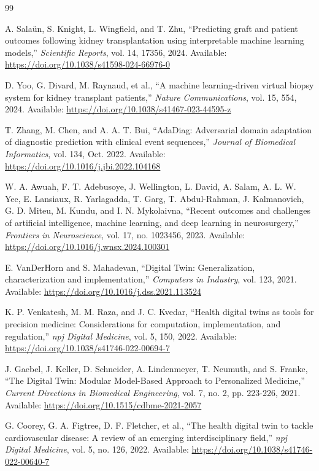 \documentclass[pdflatex,sn-mathphys-num]{sn-jnl}%
\theoremstyle{thmstyleone}%
\theoremstyle{thmstyletwo}%
\theoremstyle{thmstylethree}%
\begin{document}
\begin{thebibliography}{99}

 A. Salaün, S. Knight, L. Wingfield, and T. Zhu, ``Predicting graft and patient outcomes following kidney transplantation using interpretable machine learning models,'' \textit{Scientific Reports}, vol. 14, 17356, 2024. Available: \url{https://doi.org/10.1038/s41598-024-66976-0}

 D. Yoo, G. Divard, M. Raynaud, et al., ``A machine learning-driven virtual biopsy system for kidney transplant patients,'' \textit{Nature Communications}, vol. 15, 554, 2024. Available: \url{https://doi.org/10.1038/s41467-023-44595-z}

 T. Zhang, M. Chen, and A. A. T. Bui, ``AdaDiag: Adversarial domain adaptation of diagnostic prediction with clinical event sequences,'' \textit{Journal of Biomedical Informatics}, vol. 134, Oct. 2022. Available: \url{https://doi.org/10.1016/j.jbi.2022.104168}

 W. A. Awuah, F. T. Adebusoye, J. Wellington, L. David, A. Salam, A. L. W. Yee, E. Lansiaux, R. Yarlagadda, T. Garg, T. Abdul-Rahman, J. Kalmanovich, G. D. Miteu, M. Kundu, and I. N. Mykolaivna, ``Recent outcomes and challenges of artificial intelligence, machine learning, and deep learning in neurosurgery,'' \textit{Frontiers in Neuroscience}, vol. 17, no. 1023456, 2023. Available: \url{https://doi.org/10.1016/j.wnsx.2024.100301}

 E. VanDerHorn and S. Mahadevan, ``Digital Twin: Generalization, characterization and implementation,'' \textit{Computers in Industry}, vol. 123, 2021. Available: \url{https://doi.org/10.1016/j.dss.2021.113524}

 K. P. Venkatesh, M. M. Raza, and J. C. Kvedar, ``Health digital twins as tools for precision medicine: Considerations for computation, implementation, and regulation,'' \textit{npj Digital Medicine}, vol. 5, 150, 2022. Available: \url{https://doi.org/10.1038/s41746-022-00694-7}

 J. Gaebel, J. Keller, D. Schneider, A. Lindenmeyer, T. Neumuth, and S. Franke, ``The Digital Twin: Modular Model-Based Approach to Personalized Medicine,'' \textit{Current Directions in Biomedical Engineering}, vol. 7, no. 2, pp. 223-226, 2021. Available: \url{https://doi.org/10.1515/cdbme-2021-2057}

 G. Coorey, G. A. Figtree, D. F. Fletcher, et al., ``The health digital twin to tackle cardiovascular disease: A review of an emerging interdisciplinary field,'' \textit{npj Digital Medicine}, vol. 5, no. 126, 2022. Available: \url{https://doi.org/10.1038/s41746-022-00640-7}


\end{thebibliography}
\end{document}
